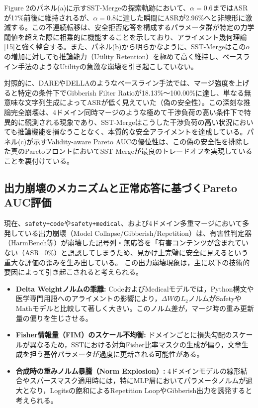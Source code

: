 \documentclass{article}
\begin{document}
Figure 2のパネル(a)に示すSST-Mergeの探索軌跡において、$\alpha=0.6$まではASRが17\%前後に維持されるが、$\alpha=0.8$に達した瞬間にASRが2.96\%へと非線形に激減する。この不連続転移は、安全拒否応答を構成するパラメータ群が特定の力学閾値を超えた際に相乗的に機能することを示しており、アライメント幾何理論[15]と強く整合する。また、パネル(b)から明らかなように、SST-Mergeはこの$\alpha$の増加に対しても推論能力（Utility Retention）を極めて高く維持し、ベースライン手法のようなUtilityの急激な崩壊を引き起こしていない。

対照的に、DAREやDELLAのようなベースライン手法では、マージ強度を上げると特定の条件下でGibberish Filter Ratioが18.13\%〜100.00\%に達し、単なる無意味な文字列生成によってASRが低く見えていた（偽の安全性）。この深刻な推論完全崩壊は、4ドメイン同時マージのような極めて干渉負荷の高い条件下で特異的に観測される現象であり、SST-Mergeはこうした干渉負荷の高い状況においても推論機能を損なうことなく、本質的な安全アライメントを達成している。パネル(c)が示すValidity-aware Pareto AUCの優位性は、この偽の安全性を排除した真のParetoフロントにおいてSST-Mergeが最良のトレードオフを実現していることを裏付けている。

\subsection{出力崩壊のメカニズムと正常応答に基づくPareto AUC評価}
現在、\texttt{safety+code}や\texttt{safety+medical}、および4ドメイン多重マージにおいて多発している出力崩壊（Model Collapse/Gibberish/Repetition）は、有害性判定器（HarmBench等）が崩壊した記号列・無応答を「有害コンテンツが含まれていない（ASR=0\%）と誤認してしまうため、見かけ上完璧に安全に見えるという重大な評価の歪みを生み出している。
この出力崩壊現象は，主に以下の技術的要因によって引き起こされると考えられる。
\begin{itemize}
    \item \textbf{Delta Weightノルムの乖離:}
    CodeおよびMedicalモデルでは，Python構文や医学専門用語へのアライメントの影響により，$\Delta W$の$L_2$ノルムがSafetyやMathモデルと比較して著しく大きい。このノルム差が，マージ時の重み更新量の偏りを生じさせる。
    \item \textbf{Fisher情報量（FIM）のスケール不均衡:}
    ドメインごとに損失勾配のスケールが異なるため，SSTにおける対角Fisher比率マスクの生成が偏り，文章生成を担う基幹パラメータが過度に更新される可能性がある。
    \item \textbf{合成時の重みノルム暴騰（Norm Explosion）:}
    4ドメインモデルの線形結合やスパースマスク適用時には，特にMLP層においてパラメータノルムが過大となり，Logitsの飽和によるRepetition LoopやGibberish出力を誘発すると考えられる。
\end{itemize}
\end{document}
